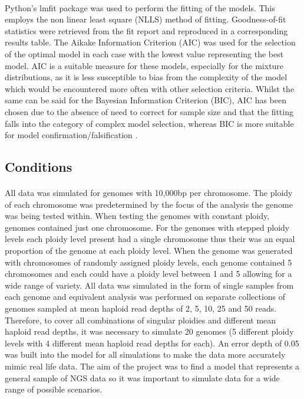 \documentclass[11pt]{article}
\begin{document}
\paragraph{}Python's lmfit package \autocite{Newville2016} was used to perform the fitting of the models. This employs the non linear least square (NLLS) method of fitting. Goodness-of-fit statistics were retrieved from the fit report and reproduced in a corresponding results table. The Aikake Information Criterion (AIC) was used for the selection of the optimal model in each case with the lowest value representing the best model. AIC is a suitable measure for these models, especially for the mixture distributions, as it is less susceptible to bias from the complexity of the model which would be encountered more often with other selection criteria. Whilst the same can be said for the Bayesian Information Criterion (BIC), AIC has been chosen due to the absence of need to correct for sample size and that the fitting falls into the category of complex model selection, whereas BIC is more suitable for  model confirmation/falsification  \autocite{Aho2014}.
\subsection{Conditions}
\paragraph{}All data was simulated for genomes with 10,000bp per chromosome. The ploidy of each chromosome was predetermined by the focus of the analysis the genome was being tested within. When testing the genomes with constant ploidy, genomes contained just one chromosome. For the genomes with stepped ploidy levels each ploidy level present had a single chromosome thus their was an equal proportion of the genome at each ploidy level. When the genome was generated with chromosomes of randomly assigned ploidy levels, each genome contained 5 chromosomes and each could have a ploidy level between 1 and 5 allowing for a wide range of variety. All data was simulated in the form of single samples from each genome and equivalent analysis was performed on separate collections of genomes sampled at mean haploid read depths of 2, 5, 10, 25 and 50 reads. Therefore, to cover all combinations of singular ploidies and different mean haploid read depths, it was necessary to simulate 20 genomes (5 different ploidy levels with 4 different mean haploid read depths for each). An error depth of 0.05 was built into the model for all simulations to make the data more accurately mimic real life data. The aim of the project was to find a model that represents a general sample of NGS data so it was important to simulate data for a wide range of possible scenarios.
\end{document}
